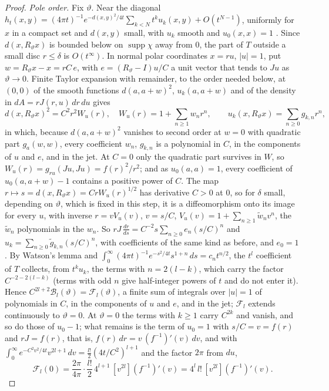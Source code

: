 \documentclass[pdflatex,sn-mathphys-num]{sn-jnl}
\theoremstyle{thmstyleone}%
\theoremstyle{thmstylethree}%
\begin{document}
\begin{proof}
\emph{Pole order.} Fix $\vartheta$. Near the diagonal $h_t(x,y)=(4\pi t)^{-1}e^{-d(x,y)^2/4t}\sum_{k<N}t^ku_k(x,y)+O(t^{N-1})$, uniformly for $x$ in a compact set and $d(x,y)$ small, with $u_k$ smooth and $u_0(x,x)=1$ \cite[Thm~2.30]{bgv1992}. Since $d(x,R_\vartheta x)$ is bounded below on $\operatorname{supp}\chi$ away from $0$, the part of $T$ outside a small disc $r\le\delta$ is $O(t^\infty)$. In normal polar coordinates $x=ru$, $|u|=1$, put $w=R_\vartheta x-x=rC\,e$, with $e=(R_\vartheta-I)u/C$ a unit vector that tends to $Ju$ as $\vartheta\to0$. Finite Taylor expansion with remainder, to the order needed below, at $(0,0)$ of the smooth functions $d(a,a+w)^2$, $u_k(a,a+w)$ and of the density in $dA=rJ(r,u)\,dr\,du$ gives
\[
d(x,R_\vartheta x)^2=C^2r^2W_u(r),\quad W_u(r)=1+\sum_{n\ge1}w_nr^n,\qquad u_k(x,R_\vartheta x)=\sum_{n\ge0}g_{k,n}r^n,
\]
in which, because $d(a,a+w)^2$ vanishes to second order at $w=0$ with quadratic part $g_a(w,w)$, every coefficient $w_n$, $g_{k,n}$ is a polynomial in $C$, in the components of $u$ and $e$, and in the jet. At $C=0$ only the quadratic part survives in $W$, so $W_u(r)=g_{ru}(Ju,Ju)=f(r)^2/r^2$; and as $u_0(a,a)=1$, every coefficient of $u_0(a,a+w)-1$ contains a positive power of $C$. The map $r\mapsto s=d(x,R_\vartheta x)=CrW_u(r)^{1/2}$ has derivative $C>0$ at $0$, so for $\delta$ small, depending on $\vartheta$, which is fixed in this step, it is a diffeomorphism onto its image for every $u$, with inverse $r=vV_u(v)$, $v=s/C$, $V_u(v)=1+\sum_{n\ge1}\tilde w_nv^n$, the $\tilde w_n$ polynomials in the $w_n$. So $rJ\,\frac{dr}{ds}=C^{-2}s\sum_{n\ge0}e_n(s/C)^n$ and $u_k=\sum_{n\ge0}\tilde g_{k,n}(s/C)^n$, with coefficients of the same kind as before, and $e_0=1$. By Watson's lemma and $\int_0^\infty(4\pi t)^{-1}e^{-s^2/4t}s^{1+n}\,ds=c_nt^{n/2}$, the $t^l$ coefficient of $T$ collects, from $t^ku_k$, the terms with $n=2(l-k)$, which carry the factor $C^{-2-2(l-k)}$ (terms with odd $n$ give half-integer powers of $t$ and do not enter it). Hence $C^{2l+2}\mathcal B_l(\vartheta)=\mathcal F_l(\vartheta)$, a finite sum of integrals over $|u|=1$ of polynomials in $C$, in the components of $u$ and $e$, and in the jet; $\mathcal F_l$ extends continuously to $\vartheta=0$. At $\vartheta=0$ the terms with $k\ge1$ carry $C^{2k}$ and vanish, and so do those of $u_0-1$; what remains is the term of $u_0=1$ with $s/C=v=f(r)$ and $rJ=f(r)$, that is, $f(r)\,dr=v\,(f^{-1})'(v)\,dv$, and with $\int_0^\infty e^{-C^2v^2/4t}v^{2l+1}\,dv=\frac{l!}2(4t/C^2)^{l+1}$ and the factor $2\pi$ from $du$,
\[
\mathcal F_l(0)=\frac{2\pi}{4\pi}\cdot\frac{l!}2\,4^{l+1}\,[v^{2l}](f^{-1})'(v)=4^l\,l!\,[v^{2l}](f^{-1})'(v).
\]


\end{proof}
\end{document}
